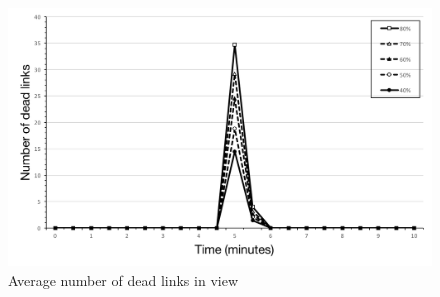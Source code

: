 \begin{figure}[ht]
  \centering
  \includegraphics[keepaspectratio=true, width=\textwidth]{images/average_dead_links}\caption{Average number of dead links in view}
  \label{fig:average_dead_links}
\end{figure}
